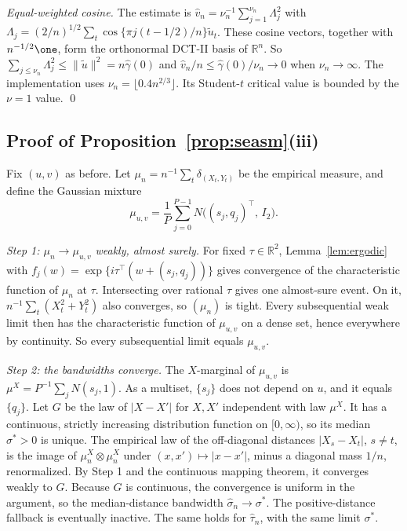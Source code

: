 \emph{Equal-weighted cosine.} The estimate is $\hat v_n=\nu_n^{-1}\sum_{j=1}^{\nu_n}\Lambda_j^2$ with $\Lambda_j=(2/n)^{1/2}\sum_t\cos\{\pi j(t-1/2)/n\}\tilde u_t$. These cosine vectors, together with $n^{-1/2}\one$, form the orthonormal DCT-II basis of $\mathbb R^n$. So $\sum_{j\le\nu_n}\Lambda_j^2\le\|\tilde u\|^2=n\hat\gamma(0)$ and $\hat v_n/n\le\hat\gamma(0)/\nu_n\to0$ when $\nu_n\to\infty$. The implementation uses $\nu_n=\lfloor0.4n^{2/3}\rfloor$. Its Student-$t$ critical value is bounded by the $\nu=1$ value. \qed

\subsection{Proof of Proposition~\ref{prop:seasm}(iii)}
Fix $(u,v)$ as before. Let $\mu_n=n^{-1}\sum_t\delta_{(X_t,Y_t)}$ be the empirical measure, and define the Gaussian mixture
\[
\mu_{u,v}=\frac1P\sum_{j=0}^{P-1}N\big((s_j,q_j)^\top,\,I_2\big).
\]

\emph{Step 1: $\mu_n\to\mu_{u,v}$ weakly, almost surely.} For fixed $\tau\in\mathbb R^2$, Lemma~\ref{lem:ergodic} with $f_j(w)=\exp\{i\tau^\top(w+(s_j,q_j))\}$ gives convergence of the characteristic function of $\mu_n$ at $\tau$. Intersecting over rational $\tau$ gives one almost-sure event. On it, $n^{-1}\sum_t(X_t^2+Y_t^2)$ also converges, so $(\mu_n)$ is tight. Every subsequential weak limit then has the characteristic function of $\mu_{u,v}$ on a dense set, hence everywhere by continuity. So every subsequential limit equals $\mu_{u,v}$.

\emph{Step 2: the bandwidths converge.} The $X$-marginal of $\mu_{u,v}$ is $\mu^X=P^{-1}\sum_jN(s_j,1)$. As a multiset, $\{s_j\}$ does not depend on $u$, and it equals $\{q_j\}$. Let $G$ be the law of $|X-X'|$ for $X,X'$ independent with law $\mu^X$. It has a continuous, strictly increasing distribution function on $[0,\infty)$, so its median $\sigma^*>0$ is unique. The empirical law of the off-diagonal distances $|X_s-X_t|$, $s\ne t$, is the image of $\mu_n^X\otimes\mu_n^X$ under $(x,x')\mapsto|x-x'|$, minus a diagonal mass $1/n$, renormalized. By Step 1 and the continuous mapping theorem, it converges weakly to $G$. Because $G$ is continuous, the convergence is uniform in the argument, so the median-distance bandwidth $\hat\sigma_n\to\sigma^*$. The positive-distance fallback is eventually inactive. The same holds for $\hat\tau_n$, with the same limit $\sigma^*$.

